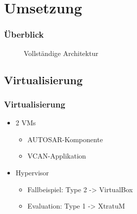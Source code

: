 \documentclass[]{beamer}
\newcommand{\inputImage}[1]{}
\begin{document}







\section{Umsetzung}
\label{sec:umsetzung}

\begin{frame}
\frametitle{Überblick}
    \begin{figure}[ht]
        \centering
        \resizebox{0.8\linewidth}{!}{\inputImage{arch_finished.dia}}
        \caption{Vollständige Architektur}
        \label{fig:arch_finished}
    \end{figure}
\end{frame}




\subsection{Virtualisierung}
\begin{frame}
\frametitle{Virtualisierung}
    \begin{itemize}
        \item 2 VMs
        \begin{itemize}
            \item AUTOSAR-Komponente
            \item VCAN-Applikation
        \end{itemize}
        \item Hypervisor
        \begin{itemize}
            \item Fallbeispiel: Type 2 -> VirtualBox
            \item Evaluation: Type 1 -> XtratuM
        \end{itemize}
    \end{itemize}
\end{frame}
\end{document}
